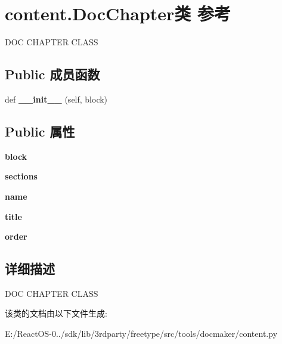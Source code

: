 \hypertarget{classcontent_1_1_doc_chapter}{}\section{content.\+Doc\+Chapter类 参考}
\label{classcontent_1_1_doc_chapter}


D\+OC C\+H\+A\+P\+T\+ER C\+L\+A\+SS  


\subsection*{Public 成员函数}
\begin{DoxyCompactItemize}
\item 
\mbox{\label{classcontent_1_1_doc_chapter_a874b695ba1a63aec216d9a85fcc4f9f6}} 
def {\bfseries \+\_\+\+\_\+init\+\_\+\+\_\+} (self, block)
\end{DoxyCompactItemize}
\subsection*{Public 属性}
\begin{DoxyCompactItemize}
\item 
\mbox{\label{classcontent_1_1_doc_chapter_aec9f072b56f76765d8968a0f567a4fb2}} 
{\bfseries block}
\item 
\mbox{\label{classcontent_1_1_doc_chapter_af4ade394cfad27039ca0bb2c844c93c9}} 
{\bfseries sections}
\item 
\mbox{\label{classcontent_1_1_doc_chapter_a5035fa9861bca40d00bb8053b046e310}} 
{\bfseries name}
\item 
\mbox{\label{classcontent_1_1_doc_chapter_a42dcaad0e6839e2d241866f597f6d592}} 
{\bfseries title}
\item 
\mbox{\label{classcontent_1_1_doc_chapter_a450b019aea5567e6528afa3be4476f66}} 
{\bfseries order}
\end{DoxyCompactItemize}


\subsection{详细描述}
D\+OC C\+H\+A\+P\+T\+ER C\+L\+A\+SS 

该类的文档由以下文件生成\+:\begin{DoxyCompactItemize}
\item 
E\+:/\+React\+O\+S-\/0../sdk/lib/3rdparty/freetype/src/tools/docmaker/content.\+py\end{DoxyCompactItemize}
